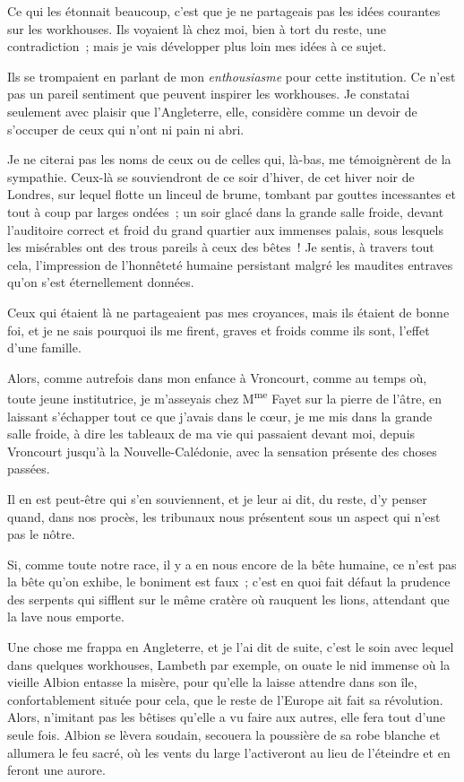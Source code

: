 \documentclass[french,twoside]{book} %
\begin{document}
Ce qui les étonnait beaucoup, c’est que je ne partageais pas les idées courantes sur les workhouses. Ils voyaient là chez moi, bien à tort du reste, une contradiction ; mais je vais développer plus loin mes idées à ce sujet.\par
Ils se trompaient en parlant de mon \emph{enthousiasme} pour cette institution. Ce n’est pas un pareil sentiment que peuvent inspirer les workhouses. Je constatai seulement avec plaisir que l’Angleterre, elle, considère comme un devoir de s’occuper de ceux qui n’ont ni pain ni abri.\par
Je ne citerai pas les noms de ceux ou de celles qui, là-bas, me témoignèrent de la sympathie. Ceux-là se souviendront de ce soir d’hiver, de  cet hiver noir de Londres, sur lequel flotte un linceul de brume, tombant par gouttes incessantes et tout à coup par larges ondées ; un soir glacé dans la grande salle froide, devant l’auditoire correct et froid du grand quartier aux immenses palais, sous lesquels les misérables ont des trous pareils à ceux des bêtes ! Je sentis, à travers tout cela, l’impression de l’honnêteté humaine persistant malgré les maudites entraves qu’on s’est éternellement données.\par
Ceux qui étaient là ne partageaient pas mes croyances, mais ils étaient de bonne foi, et je ne sais pourquoi ils me firent, graves et froids comme ils sont, l’effet d’une famille.\par
Alors, comme autrefois dans mon enfance à Vroncourt, comme au temps où, toute jeune institutrice, je m’asseyais chez M\textsuperscript{me} Fayet sur la pierre de l’âtre, en laissant s’échapper tout ce que j’avais dans le cœur, je me mis dans la grande salle froide, à dire les tableaux de ma vie qui passaient devant moi, depuis Vroncourt jusqu’à la Nouvelle-Calédonie, avec la sensation présente des choses passées.\par
Il en est peut-être qui s’en souviennent, et je leur ai dit, du reste, d’y penser quand, dans nos procès, les tribunaux nous présentent sous un aspect qui n’est pas le nôtre.\par
 Si, comme toute notre race, il y a en nous encore de la bête humaine, ce n’est pas la bête qu’on exhibe, le boniment est faux ; c’est en quoi fait défaut la prudence des serpents qui sifflent sur le même cratère où rauquent les lions, attendant que la lave nous emporte.\par
Une chose me frappa en Angleterre, et je l’ai dit de suite, c’est le soin avec lequel dans quelques workhouses, Lambeth par exemple, on ouate le nid immense où la vieille Albion entasse la misère, pour qu’elle la laisse attendre dans son île, confortablement située pour cela, que le reste de l’Europe ait fait sa révolution. Alors, n’imitant pas les bêtises qu’elle a vu faire aux autres, elle fera tout d’une seule fois. Albion se lèvera soudain, secouera la poussière de sa robe blanche et allumera le feu sacré, où les vents du large l’activeront au lieu de l’éteindre et en feront une aurore.\par
\end{document}
